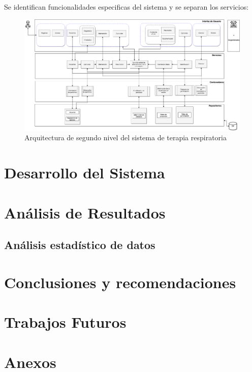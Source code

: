 \documentclass[12pt]{article}
\begin{document}
Se identifican funcionalidades especificas del sistema y se separan los servicios:



\begin{figure}[ht]
\centering
\includegraphics[scale=0.25]{imag/C4-Nivel2.png}
\caption{Arquitectura de segundo nivel del sistema de terapia respiratoria}
\label{6}
\end{figure}
\FloatBarrier








\section{Desarrollo del Sistema}

\section{Análisis de Resultados}

\subsection{Análisis estadístico de datos}





\section{Conclusiones y recomendaciones}


\section{Trabajos Futuros}




\newpage





\nocite{1}
\nocite{2}
\nocite{3}
\nocite{4}
\nocite{5}




\section{Anexos}
\end{document}
